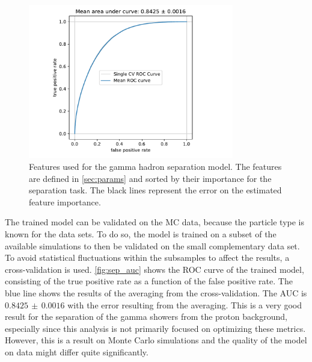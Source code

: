 \begin{figure}
  \centering
  \includegraphics[width=0.8\textwidth, page=4]{Plots/results/DBSCAN/separation_performance.pdf}
  \caption{Features used for the gamma hadron separation model. The features are defined in \autoref{sec:params} and sorted by their importance for the separation task. The black lines represent the error on the estimated feature importance.}
  \label{fig:sep_feat}
\end{figure}
%
The trained model can be validated on the MC data, because the particle type is
known for the data sets. To do so, the model is trained on a subset of the
available simulations to then be validated on the small complementary
data set. To avoid statistical fluctuations within the subsamples to affect the
results, a cross-validation is used. \autoref{fig:sep_auc} shows the ROC curve
of the trained model, consisting of the true positive rate as a function of the
false positive rate. The blue line shows the results of the averaging from the
cross-validation. The AUC is $0.8425\,\pm\,0.0016$ with the error resulting
from the averaging. This is a very good result for the separation of the gamma
showers from the proton background, especially since this analysis is not
primarily focused on optimizing these metrics. However, this is a result on
Monte Carlo simulations and the quality of the model on data might differ quite
significantly.
%

